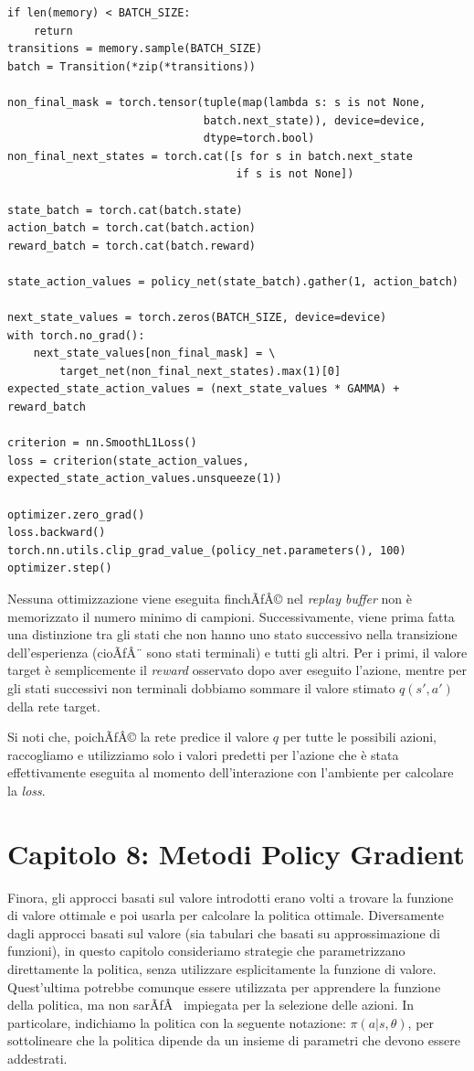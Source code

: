 ﻿\documentclass[11pt, a4paper]{report}
\begin{document}
\begin{verbatim}
if len(memory) < BATCH_SIZE:
    return
transitions = memory.sample(BATCH_SIZE)
batch = Transition(*zip(*transitions))

non_final_mask = torch.tensor(tuple(map(lambda s: s is not None,
                              batch.next_state)), device=device,
                              dtype=torch.bool)
non_final_next_states = torch.cat([s for s in batch.next_state
                                   if s is not None])

state_batch = torch.cat(batch.state)
action_batch = torch.cat(batch.action)
reward_batch = torch.cat(batch.reward)

state_action_values = policy_net(state_batch).gather(1, action_batch)

next_state_values = torch.zeros(BATCH_SIZE, device=device)
with torch.no_grad():
    next_state_values[non_final_mask] = \
        target_net(non_final_next_states).max(1)[0]
expected_state_action_values = (next_state_values * GAMMA) + reward_batch

criterion = nn.SmoothL1Loss()
loss = criterion(state_action_values, expected_state_action_values.unsqueeze(1))

optimizer.zero_grad()
loss.backward()
torch.nn.utils.clip_grad_value_(policy_net.parameters(), 100)
optimizer.step()
\end{verbatim}

Nessuna ottimizzazione viene eseguita finchÃƒÂ© nel \emph{replay buffer} non è memorizzato il numero minimo di campioni. Successivamente, viene prima fatta una distinzione tra gli stati che non hanno uno stato successivo nella transizione dell'esperienza (cioÃƒÂ¨ sono stati terminali) e tutti gli altri. Per i primi, il valore target è semplicemente il \emph{reward} osservato dopo aver eseguito l'azione, mentre per gli stati successivi non terminali dobbiamo sommare il valore stimato $q(s', a')$ della rete target.

Si noti che, poichÃƒÂ© la rete predice il valore $q$ per tutte le possibili azioni, raccogliamo e utilizziamo solo i valori predetti per l'azione che è stata effettivamente eseguita al momento dell'interazione con l'ambiente per calcolare la \emph{loss}.

\newpage

\section{Capitolo 8: Metodi Policy Gradient}
Finora, gli approcci basati sul valore introdotti erano volti a trovare la funzione di valore ottimale e poi usarla per calcolare la politica ottimale. Diversamente dagli approcci basati sul valore (sia tabulari che basati su approssimazione di funzioni), in questo capitolo consideriamo strategie che parametrizzano direttamente la politica, senza utilizzare esplicitamente la funzione di valore. Quest'ultima potrebbe comunque essere utilizzata per apprendere la funzione della politica, ma non sarÃƒÂ  impiegata per la selezione delle azioni. In particolare, indichiamo la politica con la seguente notazione: $\pi(a|s, \theta)$, per sottolineare che la politica dipende da un insieme di parametri che devono essere addestrati.
\end{document}
